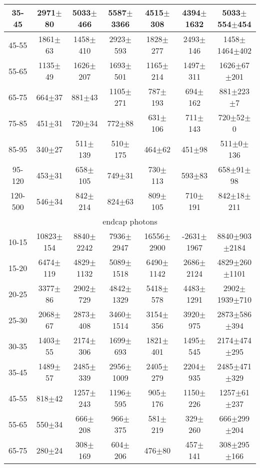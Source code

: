 \begin{table}[h]
\begin{center}
\begin{tabular}{|c|c|c|c|c|c|c|}
    35-45 & 2971$\pm$80 & 5033$\pm$466 & 5587$\pm$3366 & 4515$\pm$308 & 4394$\pm$1632 &5033$\pm$554$\pm$454  \\ \hline
    45-55 & 1861$\pm$63 & 1458$\pm$410 & 2923$\pm$593 & 1828$\pm$277 & 2493$\pm$146 &1458$\pm$1464$\pm$402  \\ \hline
    55-65 & 1135$\pm$49 & 1626$\pm$207 & 1693$\pm$501 & 1165$\pm$214 & 1497$\pm$311 &1626$\pm$67$\pm$201  \\ \hline
    65-75 & 664$\pm$37 & 881$\pm$43 & 1105$\pm$271 & 787$\pm$193 & 694$\pm$162 &881$\pm$223$\pm$7  \\ \hline
    75-85 & 451$\pm$31 & 720$\pm$34 & 772$\pm$88 & 631$\pm$106 & 711$\pm$143 &720$\pm$52$\pm$0  \\ \hline
    85-95 & 340$\pm$27 & 511$\pm$139 & 510$\pm$175 & 464$\pm$62 & 451$\pm$98 &511$\pm$0$\pm$136  \\ \hline
    95-120 & 453$\pm$31 & 658$\pm$105 & 749$\pm$31 & 730$\pm$113 & 593$\pm$83 &658$\pm$91$\pm$98  \\ \hline
    120-500 & 546$\pm$34 & 842$\pm$214 & 824$\pm$63 & 809$\pm$105 & 710$\pm$191 &842$\pm$18$\pm$211  \\ \hline
    \multicolumn{7}{|c|}{endcap photons} \\ \hline
     10-15 & 10823$\pm$154 & 8840$\pm$2242 & 7936$\pm$2947 & 16556$\pm$2900 & -2631$\pm$1967 &8840$\pm$903$\pm$2184  \\ \hline
    15-20 & 6474$\pm$119 & 4829$\pm$1132 & 5089$\pm$1518 & 6490$\pm$1142 & 2686$\pm$2124 &4829$\pm$260$\pm$1101  \\ \hline
    20-25 & 3377$\pm$86 & 2902$\pm$729 & 4842$\pm$1329 & 5418$\pm$578 & 4483$\pm$1291 &2902$\pm$1939$\pm$710  \\ \hline
    25-30 & 2068$\pm$67 & 2873$\pm$408 & 3460$\pm$1514 & 3154$\pm$356 & 3920$\pm$975 &2873$\pm$586$\pm$394  \\ \hline
    30-35 & 1403$\pm$55 & 2174$\pm$306 & 1699$\pm$693 & 1821$\pm$401 & 1495$\pm$545 &2174$\pm$474$\pm$295  \\ \hline
    35-45 & 1489$\pm$57 & 2485$\pm$339 & 2956$\pm$1009 & 2405$\pm$279 & 2204$\pm$935 &2485$\pm$471$\pm$329  \\ \hline
    45-55 & 818$\pm$42 & 1257$\pm$243 & 1196$\pm$595 & 905$\pm$176 & 1150$\pm$226 &1257$\pm$61$\pm$237  \\ \hline
    55-65 & 550$\pm$34 & 666$\pm$208 & 966$\pm$375 & 581$\pm$219 & 329$\pm$260 &666$\pm$299$\pm$204  \\ \hline
    65-75 & 280$\pm$24 & 308$\pm$169 & 604$\pm$206 & 476$\pm$80 & 457$\pm$141 &308$\pm$295$\pm$166  \\ \hline

\end{tabular}
\end{center}
\end{table}
